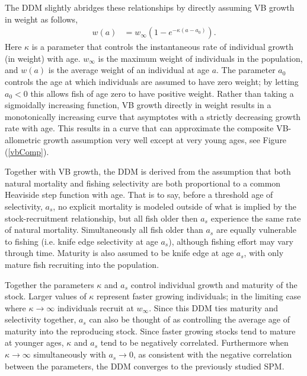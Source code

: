 %
The DDM slightly abridges these relationships by directly assuming VB
growth in weight as follows,
%
\begin{align}
w(a) &= w_\infty(1-e^{-\kappa (a-a_0)}). \label{vbGrowth}
\end{align}
%
Here $\kappa$ is a parameter that controls the instantaneous rate of individual
growth (in weight) with age. $w_\infty$ is the maximum weight of individuals
in the population, and $w(a)$ is the average weight of an individual at
age $a$. The parameter $a_0$ controls the age at which individuals are assumed
to have zero weight; by letting $a_0<0$ this allows fish of age zero to have
positive weight. Rather than taking a sigmoidally increasing function, VB growth
directly in weight results in a monotonically increasing curve that asymptotes
with a strictly decreasing growth rate with age. This results in a curve that
can approximate the composite VB-allometric growth assumption very well except 
at very young ages, see Figure (\ref{vbComp}).

%
Together with VB growth, the DDM is derived from the assumption that
both natural mortality and fishing selectivity are both proportional %
to a common Heaviside step function with age. That is to say, before a threshold
age of selectivity, $a_s$, no explicit mortality is modeled outside of what is 
implied by the stock-recruitment relationship,
but all fish older then $a_s$ experience the same rate
of natural mortality. Simultaneously all fish older than $a_s$ are equally
vulnerable to fishing (i.e. knife edge selectivity at age $a_s$), although
fishing effort may vary through time. Maturity is also assumed to be knife edge at age $a_s$, with only 
mature fish recruiting into the population.

%
Together the parameters $\kappa$ and $a_s$ control individual growth and 
maturity of the stock. Larger values of $\kappa$ represent faster growing 
individuals; in the limiting case where $\kappa\to\infty$ individuals recruit 
at $w_\infty$. Since this DDM ties maturity and selectivity together, $a_s$ can 
also be thought of as controlling the average age of maturity into the reproducing 
stock. Since faster growing stocks tend to mature at younger ages, $\kappa$ 
and $a_s$ tend to be negatively correlated. Furthermore when $\kappa\to\infty$ simultaneously 
with $a_s\to0$, as consistent with the negative correlation between the parameters, 
the DDM converges to the previously studied SPM.

